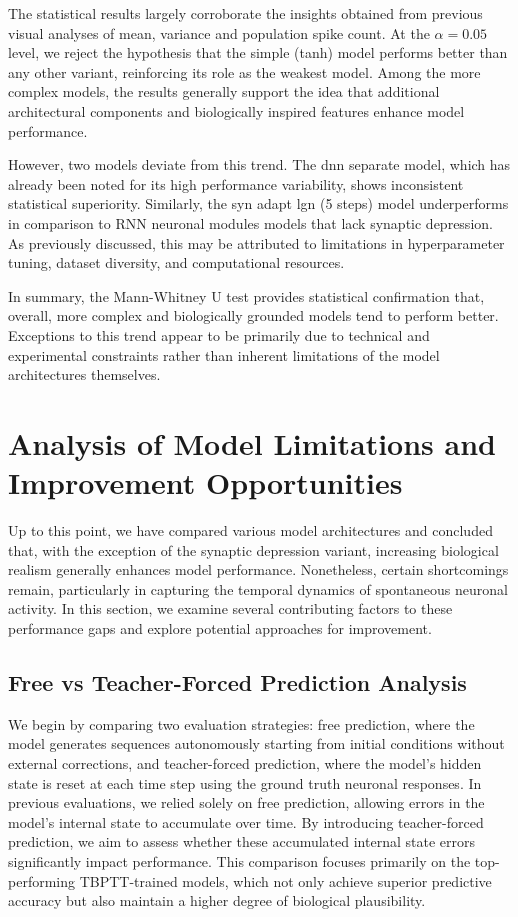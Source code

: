 The statistical results largely corroborate the insights obtained from previous visual analyses of mean, variance and population spike count. At the $\alpha = 0.05$ level, we reject the hypothesis that the simple (tanh) model performs better than any other variant, reinforcing its role as the weakest model. Among the more complex models, the results generally support the idea that additional architectural components and biologically inspired features enhance model performance.

However, two models deviate from this trend. The dnn separate model, which has already been noted for its high performance variability, shows inconsistent statistical superiority. Similarly, the syn adapt lgn (5 steps) model underperforms in comparison to RNN neuronal modules models that lack synaptic depression. As previously discussed, this may be attributed to limitations in hyperparameter tuning, dataset diversity, and computational resources.

In summary, the Mann-Whitney U test provides statistical confirmation that, overall, more complex and biologically grounded models tend to perform better. Exceptions to this trend appear to be primarily due to technical and experimental constraints rather than inherent limitations of the model architectures themselves.

\section{Analysis of Model Limitations and Improvement Opportunities}
\label{sec:performace_gaps_and_opportunities_for_improvement}

Up to this point, we have compared various model architectures and concluded that, with the exception of the synaptic depression variant, increasing biological realism generally enhances model performance. Nonetheless, certain shortcomings remain, particularly in capturing the temporal dynamics of spontaneous neuronal activity. In this section, we examine several contributing factors to these performance gaps and explore potential approaches for improvement.

\subsection{Free vs Teacher-Forced Prediction Analysis}
\label{{subsec:free_vs_teacher_forced_predictions}}

We begin by comparing two evaluation strategies: free prediction, where the model generates sequences autonomously starting from initial conditions without external corrections, and teacher-forced prediction, where the model’s hidden state is reset at each time step using the ground truth neuronal responses. In previous evaluations, we relied solely on free prediction, allowing errors in the model’s internal state to accumulate over time. By introducing teacher-forced prediction, we aim to assess whether these accumulated internal state errors significantly impact performance. This comparison focuses primarily on the top-performing TBPTT-trained models, which not only achieve superior predictive accuracy but also maintain a higher degree of biological plausibility.

